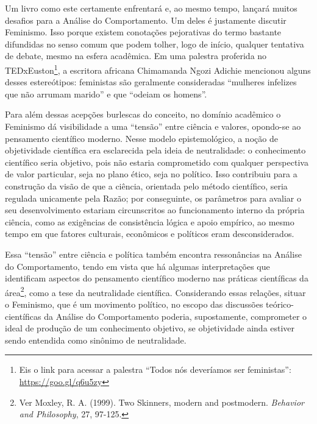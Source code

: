 Um livro como este certamente enfrentará e, ao mesmo tempo, lançará muitos desafios para a Análise do Comportamento. Um deles é justamente discutir Feminismo. Isso porque existem conotações pejorativas do termo bastante difundidas no senso comum que podem tolher, logo de início, qualquer tentativa de debate, mesmo na esfera acadêmica. Em uma palestra proferida no TEDxEuston\footnote{Eis o link para acessar a palestra “Todos nós deveríamos ser feministas”: \url{https://goo.gl/q6u5zy}}, a escritora africana Chimamanda Ngozi Adichie mencionou alguns desses estereótipos: feministas são geralmente consideradas “mulheres infelizes que não arrumam marido” e que “odeiam os homens”. 

Para além dessas acepções burlescas do conceito, no domínio acadêmico o Feminismo dá visibilidade a uma “tensão” entre ciência e valores, opondo-se ao pensamento científico moderno. Nesse modelo epistemológico, a noção de objetividade científica era esclarecida pela ideia de neutralidade: o conhecimento científico seria objetivo, pois não estaria comprometido com qualquer perspectiva de valor particular, seja no plano ético, seja no político. Isso contribuiu para a construção da visão de que a ciência, orientada pelo método científico, seria regulada unicamente pela Razão; por conseguinte, os parâmetros para avaliar o seu desenvolvimento estariam circunscritos ao funcionamento interno da própria ciência, como as exigências de consistência lógica e apoio empírico, ao mesmo tempo em que fatores culturais, econômicos e políticos eram desconsiderados. 

Essa “tensão” entre ciência e política também encontra ressonâncias na Análise do Comportamento, tendo em vista que há algumas interpretações que identificam aspectos do pensamento científico moderno nas práticas científicas da área\footnote{Ver Moxley, R. A. (1999). Two Skinners, modern and postmodern. \emph{Behavior and Philosophy}, 27, 97-125.}, como a tese da neutralidade científica. Considerando essas relações, situar o Feminismo, que é um movimento político, no escopo das discussões teórico-científicas da Análise do Comportamento poderia, supostamente, comprometer o ideal de produção de um conhecimento objetivo, se objetividade ainda estiver sendo entendida como sinônimo de neutralidade.

